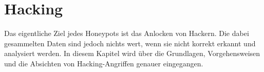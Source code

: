 \chapter{Hacking}

Das eigentliche Ziel jedes Honeypots ist das Anlocken von Hackern. Die dabei gesammelten Daten sind jedoch nichts wert, wenn sie nicht korrekt erkannt und analysiert werden. In diesem Kapitel wird über die Grundlagen, Vorgehensweisen und die Absichten von Hacking-Angriffen genauer eingegangen.




